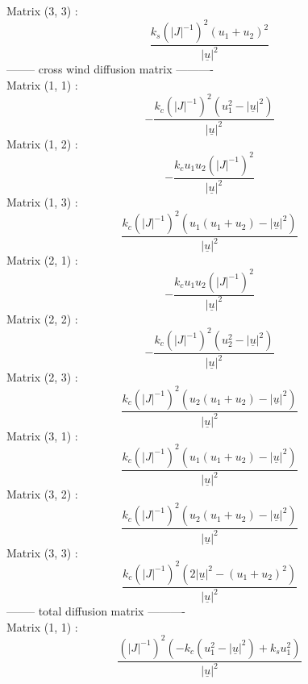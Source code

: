 Matrix (3, 3) :
\begin{dmath}
\frac{k_{s} \left(|J|^{-1}\right)^{2} \left(u_{1} + u_{2}\right)^{2}}{|\underline{u}|^{2}}
\end{dmath}
-------- cross wind diffusion matrix ---------- \\
Matrix (1, 1) :
\begin{dmath}
- \frac{k_{c} \left(|J|^{-1}\right)^{2} \left(u_{1}^{2} - |\underline{u}|^{2}\right)}{|\underline{u}|^{2}}
\end{dmath}
Matrix (1, 2) :
\begin{dmath}
- \frac{k_{c} u_{1} u_{2} \left(|J|^{-1}\right)^{2}}{|\underline{u}|^{2}}
\end{dmath}
Matrix (1, 3) :
\begin{dmath}
\frac{k_{c} \left(|J|^{-1}\right)^{2} \left(u_{1} \left(u_{1} + u_{2}\right) - |\underline{u}|^{2}\right)}{|\underline{u}|^{2}}
\end{dmath}
Matrix (2, 1) :
\begin{dmath}
- \frac{k_{c} u_{1} u_{2} \left(|J|^{-1}\right)^{2}}{|\underline{u}|^{2}}
\end{dmath}
Matrix (2, 2) :
\begin{dmath}
- \frac{k_{c} \left(|J|^{-1}\right)^{2} \left(u_{2}^{2} - |\underline{u}|^{2}\right)}{|\underline{u}|^{2}}
\end{dmath}
Matrix (2, 3) :
\begin{dmath}
\frac{k_{c} \left(|J|^{-1}\right)^{2} \left(u_{2} \left(u_{1} + u_{2}\right) - |\underline{u}|^{2}\right)}{|\underline{u}|^{2}}
\end{dmath}
Matrix (3, 1) :
\begin{dmath}
\frac{k_{c} \left(|J|^{-1}\right)^{2} \left(u_{1} \left(u_{1} + u_{2}\right) - |\underline{u}|^{2}\right)}{|\underline{u}|^{2}}
\end{dmath}
Matrix (3, 2) :
\begin{dmath}
\frac{k_{c} \left(|J|^{-1}\right)^{2} \left(u_{2} \left(u_{1} + u_{2}\right) - |\underline{u}|^{2}\right)}{|\underline{u}|^{2}}
\end{dmath}
Matrix (3, 3) :
\begin{dmath}
\frac{k_{c} \left(|J|^{-1}\right)^{2} \left(2 |\underline{u}|^{2} - \left(u_{1} + u_{2}\right)^{2}\right)}{|\underline{u}|^{2}}
\end{dmath}
-------- total diffusion matrix ---------- \\
Matrix (1, 1) :
\begin{dmath}
\frac{\left(|J|^{-1}\right)^{2} \left(- k_{c} \left(u_{1}^{2} - |\underline{u}|^{2}\right) + k_{s} u_{1}^{2}\right)}{|\underline{u}|^{2}}
\end{dmath}
